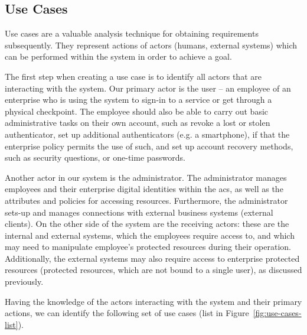 \subsection{Use Cases} \label{sec:analysis-usecases}
Use cases are a valuable analysis technique for obtaining requirements subsequently. They represent actions of actors (humans, external systems) which can be performed within the system in order to achieve a goal. 


The first step when creating a use case is to identify all actors that are interacting with the system. Our primary actor is the user -- an employee of an enterprise who is using the system to sign-in to a service or get through a physical checkpoint. The employee should also be able to carry out basic administrative tasks on their own account, such as revoke a lost or stolen authenticator, set up additional authenticators (e.g. a smartphone), if that the enterprise policy permits the use of such, and set up account recovery methods, such as security questions, or one-time passwords.

Another actor in our system is the administrator. The administrator manages employees and their enterprise digital identities within the \acrshort{acs}, as well as the attributes and policies for accessing resources. Furthermore, the administrator sets-up and manages connections with external business systems (external clients). On the other side of the system are the receiving actors: these are the internal and external systems, which the employees require access to, and which may need to manipulate employee's protected resources during their operation. Additionally, the external systems may also require access to enterprise protected resources (protected resources, which are not bound to a single user), as discussed previously\footnotemark.
% 

Having the knowledge of the actors interacting with the system and their primary actions, we can identify the following set of use cases (list in Figure~\ref{fig:use-cases-list}). 

